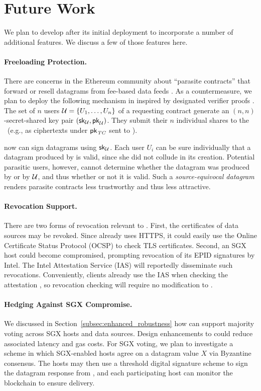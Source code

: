 \section{Future Work}
\label{sec:future-work}

We plan to develop \tc after its initial deployment to incorporate a number of additional features.
We discuss a few of those features here.

\paragraph{Freeloading Protection.}
There are concerns in the Ethereum community about ``parasite contracts'' that forward or resell datagrams from fee-based data feeds \cite{parasite}.
As a countermeasure, we plan to deploy the following mechanism in \tc inspired by designated verifier proofs \cite{JakobssonSI1996}.
The set of $n$ users ${\cal U} = \{U_1, \ldots, U_n\}$ of a requesting contract generate an $(n,n)$-secret-shared key pair $(\sk_{\cal U}, \pk_{\cal U})$.
They submit their $n$ individual shares to the \tc\ \encname (e.g., as ciphertexts under ${\sf pk}_{\it TC}$ sent to \tcont).

\tc now can sign datagrams using $\sk_{\cal U}$. Each user $U_i$ can be sure individually that a datagram produced by \tc is valid, since she did not collude in its creation. Potential parasitic users, however, cannot determine whether the datagram was produced by \tcont or by ${\cal U}$, and thus whether or not it is valid.
Such a \emph{source-equivocal datagram} renders parasite contracts less trustworthy and thus less attractive.

\paragraph{Revocation Support.}
There are two forms of revocation relevant to \tc.
First, the certificates of data sources may be revoked.
Since \tc already uses HTTPS, it could easily use the Online Certificate Status Protocol (OCSP) to check TLS certificates.
Second, an SGX host could become compromised, prompting revocation of its EPID signatures by Intel.
The Intel Attestation Service (IAS) will reportedly disseminate such revocations.
Conveniently, clients already use the IAS when checking the attestation \sigatt, so revocation checking will require no modification to \tc.

\paragraph{Hedging Against SGX Compromise.}
We discussed in Section~\ref{subsec:enhanced_robustness} how \tc can support majority voting across SGX hosts and data sources.
Design enhancements to \tc could reduce associated latency and gas costs.
For SGX voting, we plan to investigate a scheme in which SGX-enabled \tc hosts agree on a datagram value $X$ via Byzantine consensus.
The hosts may then use a threshold digital signature scheme to sign the datagram response from \tcadd,
and each participating host can monitor the blockchain to ensure delivery.

